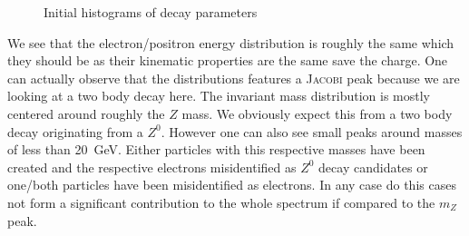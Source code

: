 \documentclass[11pt,a4paper,notitlepage]{scrartcl}
\begin{document}
\begin{figure}[htbp]
\begin{subfigure}{.8\linewidth}
\end{subfigure}
\caption{Initial histograms of decay parameters}
\label{fig:hist_ini}
\end{figure}
We see that the electron/positron energy distribution is roughly the same which they should be as their kinematic properties are the same save the charge. One can actually observe that the distributions features a \textsc{Jacobi} peak because we are looking at a two body decay here. The invariant mass distribution is mostly centered around roughly the $Z$ mass. We obviously expect this from a two body decay originating from a $Z^0$. However one can also see small peaks around masses of less than \SI{20}{\giga\eV}. Either particles with this respective masses have been created and the respective electrons misidentified as $Z^0$ decay candidates or one/both particles have been misidentified as electrons. In any case do this cases not form a significant contribution to the whole spectrum if compared to the $m_Z$ peak. 
\end{document}
